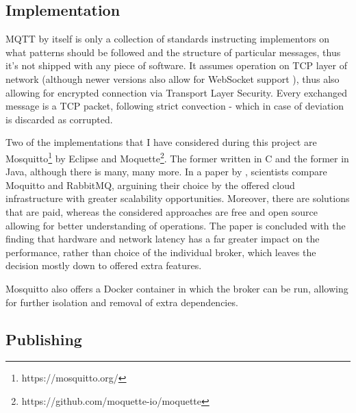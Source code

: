 \subsection{Implementation}
MQTT by itself is only a collection of standards instructing implementors on what patterns should be followed and the structure of particular messages, thus it's not shipped with any piece of software. It assumes operation on TCP layer of network (although newer versions also allow for WebSocket support \citep{mijovic2016comparing}), thus also allowing for encrypted connection via Transport Layer Security. Every exchanged message is a TCP packet, following strict convection - which in case of deviation is discarded as corrupted.

Two of the implementations that I have considered during this project are Mosquitto\footnote{https://mosquitto.org/} by Eclipse and Moquette\footnote{https://github.com/moquette-io/moquette}. The former written in C and the former in Java, although there is many, many more. In a paper by \citet{de2019performance}, scientists compare Moquitto and RabbitMQ, arguining their choice by the offered cloud infrastructure with greater scalability opportunities. Moreover, there are solutions that are paid, whereas the considered approaches are free and open source allowing for better understanding of operations. The paper is concluded with the finding that hardware and network latency has a far greater impact on the performance, rather than choice of the individual broker, which leaves the decision mostly down to offered extra features.

Mosquitto also offers a Docker container \cite{light2017mosquitto} in which the broker can be run, allowing for further isolation and removal of extra dependencies.

\subsection{Publishing}

